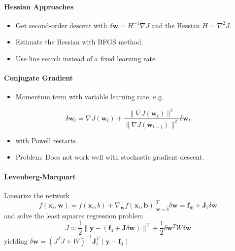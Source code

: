 \documentclass[a4paper, 11pt, accentcolor = tud3b]{tudreport}
\renewcommand{\vec}[1]{\mathbf{#1}}
\begin{document}
				\paragraph{Hessian Approaches}
					\begin{itemize}
						\item Get second-order descent with \( \delta\vec{w} = H^{-1} \nabla J \) and the Hessian \( H = \nabla^2 J \).
						\item Estimate the Hessian with BFGS method.
						\item Use line search instead of a fixed learning rate.
					\end{itemize}

				\paragraph{Conjugate Gradient}
					\begin{itemize}
						\item Momentum term with variable learning rate, e.g.
					\end{itemize}
					\begin{equation}
						\delta\vec{w}_t = \nabla J(\vec{w}_t) + \frac{\lVert \nabla J(\vec{w}_t) \rVert ^2}{\lVert \nabla J(\vec{w}_{t - 1}) \rVert^2} \delta\vec{w}_{t}
					\end{equation}
					\begin{itemize}
						\item[] with Powell restarts.
						\item Problem: Does not work well with stochastic gradient descent.
					\end{itemize}

				\paragraph{Levenberg-Marquart}
					Linearize the network
					\begin{equation}
						f(\vec{x}_i, \vec{w}) = f(\vec{x}_i, b) + \nabla_{\vec{w}} f(\vec{x}_i, \vec{b}) \big\vert_{\vec{w} = b}^T \delta\vec{w} = \vec{f}_{i0} + \vec{J}_i \delta\vec{w}
					\end{equation}
					and solve the least squares regression problem
					\begin{equation}
						J \approx \frac{1}{2} \lVert \vec{y} - (\vec{f}_0 + \vec{J} \delta\vec{w}) \rVert^2 + \frac{1}{2} \delta\vec{w}^T W \delta\vec{w}
					\end{equation}
					yielding \( \delta\vec{w} = (J^T J + W)^{-1} \vec{J}_i^T (\vec{y} - \vec{f}_0) \)
					
\end{document}

